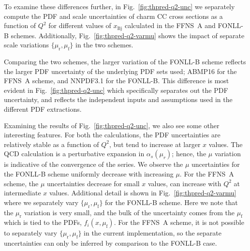 \documentclass[pdftex,twocolumn,epjc3]{svjour3}          %
\newcommand{\xbj}{\ensuremath{x_{\text{Bj}}}\xspace}
\newcommand{\fonll} {{FONLL-B}\xspace}
\newcommand{\ffns} {{FFNS~A}\xspace}
\begin{document}
To examine these differences further, in Fig.~\ref{fig:thpred-q2-unc}
we separately compute the PDF and scale uncertainties of charm CC
cross sections as a function of $Q^2$ for different values of \xbj
calculated in the \ffns and \fonll schemes.
%
Additionally, Fig.~\ref{fig:thpred-q2-varmu} shows the impact of
separate scale variations $\{\mu_\mathrm{r} , \mu_\mathrm{f}\}$ in the
two schemes.


Comparing the two schemes, the larger variation of the  \fonll scheme
reflects the larger PDF uncertainty of the underlying PDF sets used;
ABMP16 for the  \ffns scheme, and NNPDF3.1 for the  \fonll.
%
This difference is most evident in  Fig.~\ref{fig:thpred-q2-unc} which
specifically separates out the PDF uncertainty, and  reflects
the independent inputs and assumptions used in the different  PDF extractions. 

Examining the results of Fig.~\ref{fig:thpred-q2-unc}, we also see
some other interesting features.
%
For both the calculations, the 
PDF uncertainties are relatively stable as a function of $Q^2$, but
tend to increase at larger $x$ values.
%
The QCD calculation is a perturbative expansion in $\alpha_s(\mu_r)$;
hence, the  $\mu$ variation
is indicative of the convergence of the series. 
%
We observe 
the $\mu$ uncertainties for the  \fonll scheme uniformly decrease with increasing $\mu$.
%
For the  \ffns scheme, the $\mu$ uncertainties decrease for small $x$ values,
can increase with $Q^2$ at intermediate $x$ values.
%
Additional detail is shown in  Fig.~\ref{fig:thpred-q2-varmu}
where we separately vary $\{\mu_\mathrm{r} , \mu_\mathrm{f}\}$
for the  \fonll scheme.
Here we note that the $\mu_\mathrm{r}$ variation is very small,
and the bulk  of the uncertainty comes from the  $\mu_\mathrm{f}$ which is tied to the
PDFs, $f_i(x,\mu_\mathrm{f})$.
%
For the  \ffns scheme, it is not possible to  separately vary $\{\mu_\mathrm{r} , \mu_\mathrm{f}\}$
in the current implementation, so  the separate uncertainties can only be inferred
by comparison to the \fonll case. 
\end{document}
